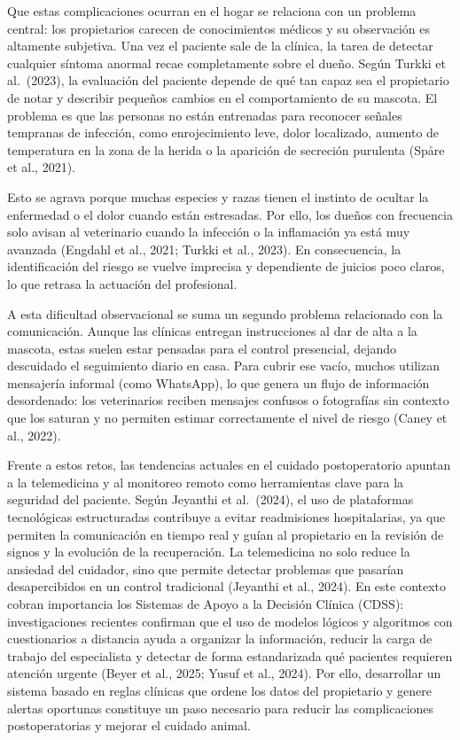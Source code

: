 \documentclass[stu, spanish]{apa7}
\begin{document}
Que estas complicaciones ocurran en el hogar se relaciona con un problema central: los propietarios carecen de conocimientos m\'{e}dicos y su observaci\'{o}n es altamente subjetiva. Una vez el paciente sale de la cl\'{i}nica, la tarea de detectar cualquier s\'{i}ntoma anormal recae completamente sobre el due\~{n}o. Seg\'{u}n Turkki et al.\ (2023), la evaluaci\'{o}n del paciente depende de qu\'{e} tan capaz sea el propietario de notar y describir peque\~{n}os cambios en el comportamiento de su mascota. El problema es que las personas no est\'{a}n entrenadas para reconocer se\~{n}ales tempranas de infecci\'{o}n, como enrojecimiento leve, dolor localizado, aumento de temperatura en la zona de la herida o la aparici\'{o}n de secreci\'{o}n purulenta (Sp\r{a}re et al., 2021).

Esto se agrava porque muchas especies y razas tienen el instinto de ocultar la enfermedad o el dolor cuando est\'{a}n estresadas. Por ello, los due\~{n}os con frecuencia solo avisan al veterinario cuando la infecci\'{o}n o la inflamaci\'{o}n ya est\'{a} muy avanzada (Engdahl et al., 2021; Turkki et al., 2023). En consecuencia, la identificaci\'{o}n del riesgo se vuelve imprecisa y dependiente de juicios poco claros, lo que retrasa la actuaci\'{o}n del profesional.

A esta dificultad observacional se suma un segundo problema relacionado con la comunicaci\'{o}n. Aunque las cl\'{i}nicas entregan instrucciones al dar de alta a la mascota, estas suelen estar pensadas para el control presencial, dejando descuidado el seguimiento diario en casa. Para cubrir ese vac\'{i}o, muchos utilizan mensajer\'{i}a informal (como WhatsApp), lo que genera un flujo de informaci\'{o}n desordenado: los veterinarios reciben mensajes confusos o fotograf\'{i}as sin contexto que los saturan y no permiten estimar correctamente el nivel de riesgo (Caney et al., 2022).

Frente a estos retos, las tendencias actuales en el cuidado postoperatorio apuntan a la telemedicina y al monitoreo remoto como herramientas clave para la seguridad del paciente. Seg\'{u}n Jeyanthi et al.\ (2024), el uso de plataformas tecnol\'{o}gicas estructuradas contribuye a evitar readmisiones hospitalarias, ya que permiten la comunicaci\'{o}n en tiempo real y gu\'{i}an al propietario en la revisi\'{o}n de signos y la evoluci\'{o}n de la recuperaci\'{o}n. La telemedicina no solo reduce la ansiedad del cuidador, sino que permite detectar problemas que pasar\'{i}an desapercibidos en un control tradicional (Jeyanthi et al., 2024). En este contexto cobran importancia los Sistemas de Apoyo a la Decisi\'{o}n Cl\'{i}nica (CDSS): investigaciones recientes confirman que el uso de modelos l\'{o}gicos y algoritmos con cuestionarios a distancia ayuda a organizar la informaci\'{o}n, reducir la carga de trabajo del especialista y detectar de forma estandarizada qu\'{e} pacientes requieren atenci\'{o}n urgente (Beyer et al., 2025; Yusuf et al., 2024). Por ello, desarrollar un sistema basado en reglas cl\'{i}nicas que ordene los datos del propietario y genere alertas oportunas constituye un paso necesario para reducir las complicaciones postoperatorias y mejorar el cuidado animal.
\end{document}
